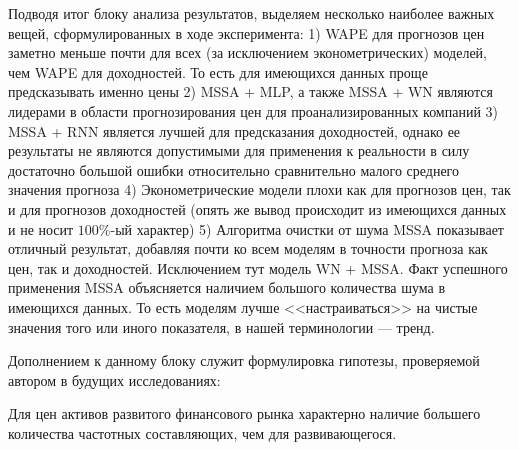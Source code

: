 Подводя итог блоку анализа результатов, выделяем несколько наиболее важных вещей, сформулированных в ходе эксперимента: 1) WAPE для прогнозов цен заметно меньше почти для всех (за исключением эконометрических) моделей, чем WAPE для доходностей. То есть для имеющихся данных проще предсказывать именно цены 2) MSSA + MLP, а также MSSA + WN являются лидерами в области прогнозирования цен для проанализированных компаний 3) MSSA + RNN является лучшей для предсказания доходностей, однако ее результаты не являются допустимыми для применения к реальности в силу достаточно большой ошибки относительно сравнительно малого среднего значения прогноза 4) Эконометрические модели плохи как для прогнозов цен, так и для прогнозов доходностей (опять же вывод происходит из имеющихся данных и не носит $100\%$-ый характер) 5) Алгоритма очистки от шума MSSA показывает отличный результат, добавляя почти ко всем моделям в точности прогноза как цен, так и доходностей. Исключением тут модель WN + MSSA. Факт успешного применения MSSA объясняется наличием большого количества шума в имеющихся данных. То есть моделям лучше <<настраиваться>> на чистые значения того или иного показателя, в нашей терминологии --- тренд.

Дополнением к данному блоку служит формулировка гипотезы, проверяемой автором в будущих исследованиях:
\begin{uncertainty}
	Для цен активов развитого финансового рынка характерно наличие большего количества частотных составляющих, чем для развивающегося.
\end{uncertainty}
